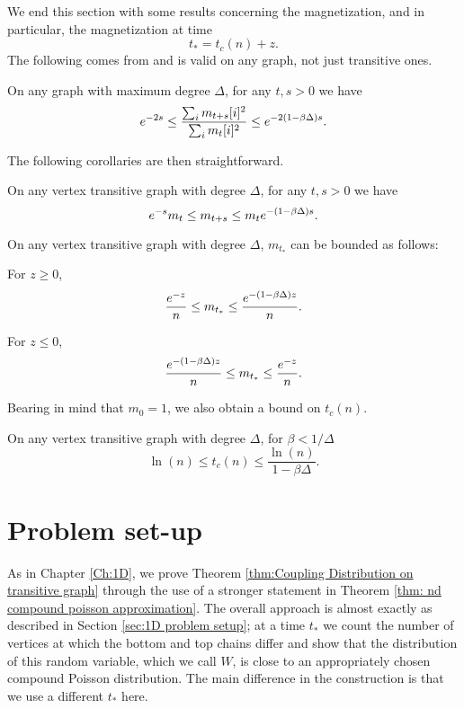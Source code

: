 We end this section with some results concerning the magnetization, and in particular, the magnetization at time
\begin{equation}
	t_* = t_c(n) + z.
\end{equation}
The following comes from \cite{Lubetzky2017-nc} and is valid on any graph, not just transitive ones.
\begin{lemma}
	On any graph with maximum degree $\Delta$, for any $t, s > 0$ we have
	\begin{equation}
		e^{-2s} \leq \frac{\sum_i m_{t+s}[i]^2}{\sum_i m_t[i]^2} \leq e^{-2(1 - \beta \Delta)s}.
	\end{equation}
\end{lemma}
The following corollaries are then straightforward.
\begin{corollary}
	\label{cor:exponential decay magnetization}
	On any vertex transitive graph with degree $\Delta$, for any $t, s > 0$ we have
	\begin{equation}
		e^{-s} m_t \leq m_{t+s} \leq m_t e^{-(1 - \beta \Delta)s}.
	\end{equation}
\end{corollary}
\begin{corollary}
\label{cor:magnetization of t star}
	On any vertex transitive graph with degree $\Delta$, $m_{t_*}$ can be bounded as follows:

	For $z \geq 0$,
	\begin{equation}
		\frac{e^{-z}}{n} \leq m_{t_*} \leq \frac{e^{-(1 - \beta \Delta)z}}{n}.
	\end{equation}

	For $z \leq 0$,
	\begin{equation}
		\frac{e^{-(1 - \beta \Delta)z}}{n} \leq m_{t_*} \leq \frac{e^{-z}}{n}.
	\end{equation}
\end{corollary}
Bearing in mind that $m_0 = 1$, we also obtain a bound on $t_c(n)$.
\begin{corollary}
	On any vertex transitive graph with degree $\Delta$, for $\beta < 1/\Delta$
	\begin{equation}
		\ln(n) \leq t_c(n) \leq \frac{\ln(n)}{1 - \beta \Delta}.
	\end{equation}
\end{corollary}

\section{Problem set-up}
\label{sec:nd problem setup}
As in Chapter \ref{Ch:1D}, we prove Theorem \ref{thm:Coupling Distribution on transitive graph} through the use of a stronger statement in Theorem \ref{thm: nd compound poisson approximation}. The overall approach is almost exactly as described in Section \ref{sec:1D problem setup}; at a time $t_*$ we count the number of vertices at which the bottom and top chains differ and show that the distribution of this random variable, which we call $W$, is close to an appropriately chosen compound Poisson distribution. The main difference in the construction is that we use a different $t_*$ here.

